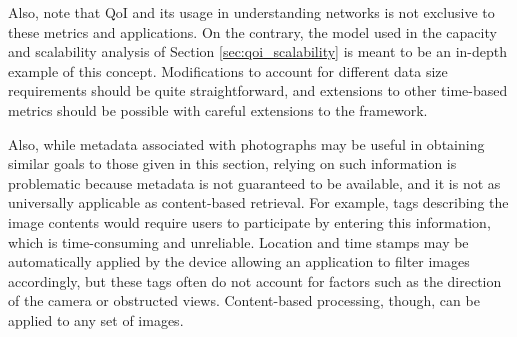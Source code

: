 Also, note that QoI and its usage in understanding networks is not exclusive to these metrics and applications.  On the contrary, the model used in the capacity and scalability analysis of Section \ref{sec:qoi_scalability} is meant to be an in-depth example of this concept.  Modifications to account for different data size requirements should be quite straightforward, and extensions to other time-based metrics should be possible with careful extensions to the framework.

Also, while metadata associated with photographs may be useful in obtaining similar goals to those given in this section, relying on such information is problematic because metadata is not guaranteed to be available, and it is not as universally applicable as content-based retrieval.  For example, tags describing the image contents would require users to participate by entering this information, which is time-consuming and unreliable.  Location and time stamps may be automatically applied by the device allowing an application to filter images accordingly, but these tags often do not account for factors such as the direction of the camera or obstructed views.  Content-based processing, though, can be applied to any set of images.



